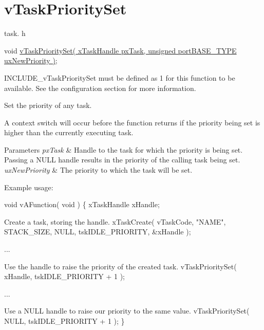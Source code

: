 \hypertarget{group__v_task_priority_set}{\section{v\-Task\-Priority\-Set}
\label{group__v_task_priority_set}
}
task. h 
\begin{DoxyPre}void \hyperlink{tasks_8c_a9583c33af329e2a91b447641cce364cd}{vTaskPrioritySet( xTaskHandle pxTask, unsigned portBASE\_TYPE uxNewPriority )};\end{DoxyPre}


I\-N\-C\-L\-U\-D\-E\-\_\-v\-Task\-Priority\-Set must be defined as 1 for this function to be available. See the configuration section for more information.

Set the priority of any task.

A context switch will occur before the function returns if the priority being set is higher than the currently executing task.


\begin{DoxyParams}{Parameters}
{\em px\-Task} & Handle to the task for which the priority is being set. Passing a N\-U\-L\-L handle results in the priority of the calling task being set.\\
\hline
{\em ux\-New\-Priority} & The priority to which the task will be set.\\
\hline
\end{DoxyParams}
Example usage\-: 
\begin{DoxyPre}
 void vAFunction( void )
 \{
 xTaskHandle xHandle;\end{DoxyPre}



\begin{DoxyPre}Create a task, storing the handle.
     xTaskCreate( vTaskCode, "NAME", STACK\_SIZE, NULL, tskIDLE\_PRIORITY, \&xHandle );\end{DoxyPre}



\begin{DoxyPre}...\end{DoxyPre}



\begin{DoxyPre}Use the handle to raise the priority of the created task.
     vTaskPrioritySet( xHandle, tskIDLE\_PRIORITY + 1 );\end{DoxyPre}



\begin{DoxyPre}...\end{DoxyPre}



\begin{DoxyPre}Use a NULL handle to raise our priority to the same value.
     vTaskPrioritySet( NULL, tskIDLE\_PRIORITY + 1 );
 \}
   \end{DoxyPre}
 